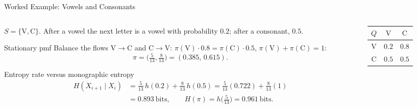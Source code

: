 \begin{frame}{Worked Example: Vowels and Consonants}
  \small
  \begin{columns}[T]
    \begin{column}{0.6\textwidth}
      $S=\{\mathrm V,\mathrm C\}$. After a vowel the next letter is a vowel with probability $0.2$; after a consonant, $0.5$.
      \begin{block}{Stationary pmf}
        Balance the flows $\mathrm V\to\mathrm C$ and $\mathrm C\to\mathrm V$: $\pi(\mathrm V)\cdot0.8=\pi(\mathrm C)\cdot0.5$, $\pi(\mathrm V)+\pi(\mathrm C)=1$:
        \[
          \pi=\big(\tfrac5{13},\tfrac8{13}\big)=(0.385,\,0.615).
        \]
      \end{block}
      \begin{block}{Entropy rate versus monographic entropy}
        \vspace{-2pt}
        \begin{align*}
          H(X_{i+1}\mid X_i)&=\tfrac5{13}\,h(0.2)+\tfrac8{13}\,h(0.5)=\tfrac5{13}(0.722)+\tfrac8{13}(1)\\
          &=0.893\ \text{bits},\qquad H(\pi)=h\big(\tfrac5{13}\big)=0.961\ \text{bits}.
        \end{align*}
        \vspace{-8pt}
      \end{block}
    \end{column}
    \begin{column}{0.38\textwidth}
      \centering
      \renewcommand{\arraystretch}{1.4}
      \begin{tabular}{@{}c|cc@{}}
        $Q$ & $\mathrm V$ & $\mathrm C$ \\ \hline
        $\mathrm V$ & $0.2$ & $0.8$ \\
        $\mathrm C$ & $0.5$ & $0.5$
      \end{tabular}
      \par\medskip
      \par

\end{column}
\end{columns}
\end{frame}
